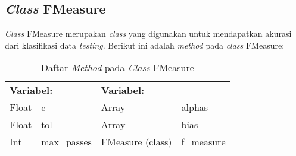 \addtocounter{table}{-1}
\subsection{\textit{Class} FMeasure}
\textit{Class} FMeasure merupakan \textit{class} yang digunakan untuk mendapatkan akurasi dari klasifikasi data \textit{testing}. Berikut ini adalah \textit{method} pada \textit{class }FMeasure:
\begin{table}[H]
	\caption{Daftar \textit{Method} pada \textit{Class} FMeasure}
	\centering
	\small
	\begin{adjustbox}{width=1\textwidth}	
	\begin{tabular}{|p{4cm} p{2.1cm} p{4cm} p{2.1cm}|}
		\hline
		\multicolumn{2}{|l}{\textbf{Variabel:}}&\multicolumn{2}{l|}{\textbf{Variabel:}}\\
		Float&c&Array&alphas\\
		Float&tol&Array&bias \\
		Int&max\_passes&FMeasure (class)&f\_measure\\
		\hline
	\end{tabular}
	\end{adjustbox}
\end{table}
